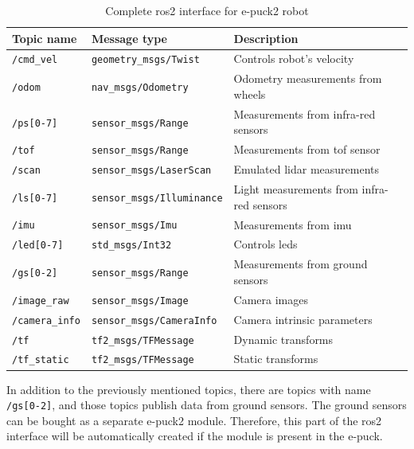 \begin{table}[H]
    \begin{adjustwidth}{-1.5in}{-1.5in}
    \centering
    \begin{tabular}{|l|l|l|}
        \hline
        \textbf{Topic name} & \textbf{Message type} & \textbf{Description} \\
        \hline
        \texttt{/cmd\_vel} & \texttt{geometry\_msgs/Twist} & Controls robot's velocity \\
        \hline
        \texttt{/odom} & \texttt{nav\_msgs/Odometry} & Odometry measurements from wheels \\
        \hline
        \texttt{/ps[0-7]} & \texttt{sensor\_msgs/Range} & Measurements from infra-red sensors \\
        \hline
        \texttt{/tof} & \texttt{sensor\_msgs/Range} & Measurements from \acs{tof} sensor \\
        \hline
        \texttt{/scan} & \texttt{sensor\_msgs/LaserScan} & Emulated \ac{lidar} measurements \\
        \hline
        \texttt{/ls[0-7]} & \texttt{sensor\_msgs/Illuminance} & Light measurements from infra-red sensors \\
        \hline
        \texttt{/imu} & \texttt{sensor\_msgs/Imu} & Measurements from \acs{imu} \\
        \hline
        \texttt{/led[0-7]} & \texttt{std\_msgs/Int32} & Controls \acsp{led} \\
        \hline
        \texttt{/gs[0-2]} & \texttt{sensor\_msgs/Range} & Measurements from ground sensors \\
        \hline
        \texttt{/image\_raw} & \texttt{sensor\_msgs/Image} & Camera images \\
        \hline
        \texttt{/camera\_info} & \texttt{sensor\_msgs/CameraInfo} & Camera intrinsic parameters \\
        \hline
        \texttt{/tf} & \texttt{tf2\_msgs/TFMessage} & Dynamic transforms \\
        \hline
        \texttt{/tf\_static} & \texttt{tf2\_msgs/TFMessage} & Static transforms \\
        \hline
    \end{tabular}
    \caption{Complete \ac{ros2} interface for e-puck2 robot}
    \label{tab:simulation:complete_interface}
    \end{adjustwidth}
\end{table}

In addition to the previously mentioned topics, there are topics with name \texttt{/gs[0-2]}, and those topics publish data from ground sensors. The ground sensors can be bought as a separate e-puck2 module. Therefore, this part of the \ac{ros2} interface will be automatically created if the module is present in the e-puck.

